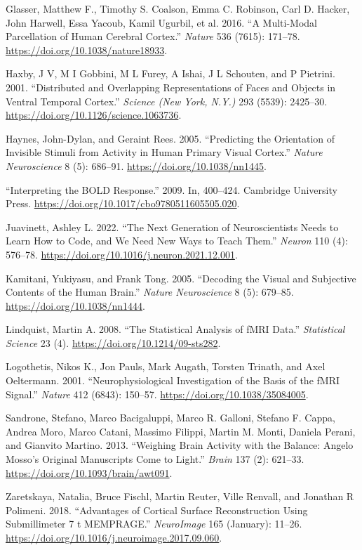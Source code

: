 \documentclass[
  letterpaper,
]{report}
\newlength{\cslhangindent}
\newenvironment{CSLReferences}[2] %
 {\begin{list}{}{%
  \setlength{\itemindent}{0pt}
  \setlength{\leftmargin}{0pt}
  \setlength{\parsep}{0pt}
  \ifodd #1
   \setlength{\leftmargin}{\cslhangindent}
   \setlength{\itemindent}{-1\cslhangindent}
  \fi
  \setlength{\itemsep}{#2\baselineskip}}}
 {\end{list}}
\begin{document}
\begin{CSLReferences}{1}{0}
Glasser, Matthew F., Timothy S. Coalson, Emma C. Robinson, Carl D.
Hacker, John Harwell, Essa Yacoub, Kamil Ugurbil, et al. 2016. {``A
Multi-Modal Parcellation of Human Cerebral Cortex.''} \emph{Nature} 536
(7615): 171--78. \url{https://doi.org/10.1038/nature18933}.

Haxby, J V, M I Gobbini, M L Furey, A Ishai, J L Schouten, and P
Pietrini. 2001. {``Distributed and Overlapping Representations of Faces
and Objects in Ventral Temporal Cortex.''} \emph{Science (New York,
N.Y.)} 293 (5539): 2425--30.
\url{https://doi.org/10.1126/science.1063736}.

Haynes, John-Dylan, and Geraint Rees. 2005. {``Predicting the
Orientation of Invisible Stimuli from Activity in Human Primary Visual
Cortex.''} \emph{Nature Neuroscience} 8 (5): 686--91.
\url{https://doi.org/10.1038/nn1445}.

{``Interpreting the BOLD Response.''} 2009. In, 400--424. Cambridge
University Press. \url{https://doi.org/10.1017/cbo9780511605505.020}.

Juavinett, Ashley L. 2022. {``The Next Generation of Neuroscientists
Needs to Learn How to Code, and We Need New Ways to Teach Them.''}
\emph{Neuron} 110 (4): 576--78.
\url{https://doi.org/10.1016/j.neuron.2021.12.001}.

Kamitani, Yukiyasu, and Frank Tong. 2005. {``Decoding the Visual and
Subjective Contents of the Human Brain.''} \emph{Nature Neuroscience} 8
(5): 679--85. \url{https://doi.org/10.1038/nn1444}.

Lindquist, Martin A. 2008. {``The Statistical Analysis of fMRI Data.''}
\emph{Statistical Science} 23 (4).
\url{https://doi.org/10.1214/09-sts282}.

Logothetis, Nikos K., Jon Pauls, Mark Augath, Torsten Trinath, and Axel
Oeltermann. 2001. {``Neurophysiological Investigation of the Basis of
the fMRI Signal.''} \emph{Nature} 412 (6843): 150--57.
\url{https://doi.org/10.1038/35084005}.

Sandrone, Stefano, Marco Bacigaluppi, Marco R. Galloni, Stefano F.
Cappa, Andrea Moro, Marco Catani, Massimo Filippi, Martin M. Monti,
Daniela Perani, and Gianvito Martino. 2013. {``Weighing Brain Activity
with the Balance: Angelo Mosso{'}s Original Manuscripts Come to
Light.''} \emph{Brain} 137 (2): 621--33.
\url{https://doi.org/10.1093/brain/awt091}.

Zaretskaya, Natalia, Bruce Fischl, Martin Reuter, Ville Renvall, and
Jonathan R Polimeni. 2018. {``Advantages of Cortical Surface
Reconstruction Using Submillimeter 7 t MEMPRAGE.''} \emph{NeuroImage}
165 (January): 11--26.
\url{https://doi.org/10.1016/j.neuroimage.2017.09.060}.

\end{CSLReferences}
\end{document}
